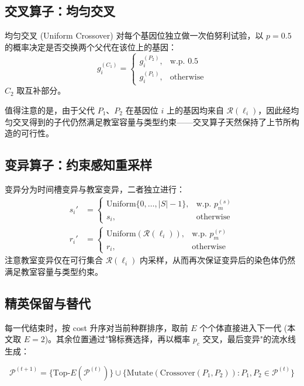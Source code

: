 \subsection{交叉算子：均匀交叉}

均匀交叉 (Uniform Crossover) 对每个基因位独立做一次伯努利试验，以 $p = 0.5$ 的概率决定是否交换两个父代在该位上的基因：
\begin{equation}
  g_i^{(C_1)} = \begin{cases} g_i^{(P_2)}, & \text{w.p. } 0.5 \\ g_i^{(P_1)}, & \text{otherwise} \end{cases}
\end{equation}
$C_2$ 取互补部分。

值得注意的是，由于父代 $P_1$、$P_2$ 在基因位 $i$ 上的基因均来自 $\mathcal{R}(\ell_i)$，因此经均匀交叉得到的子代仍然满足教室容量与类型约束——交叉算子天然保持了上节所构造的可行性。

\subsection{变异算子：约束感知重采样}

变异分为时间槽变异与教室变异，二者独立进行：
\begin{align}
  s_i' &= \begin{cases} \mathrm{Uniform}\{0,\ldots,|S|-1\}, & \text{w.p. } p_m^{(s)} \\ s_i, & \text{otherwise} \end{cases} \\
  r_i' &= \begin{cases} \mathrm{Uniform}(\mathcal{R}(\ell_i)), & \text{w.p. } p_m^{(r)} \\ r_i, & \text{otherwise} \end{cases}
\end{align}
注意教室变异仅在可行集合 $\mathcal{R}(\ell_i)$ 内采样，从而再次保证变异后的染色体仍然满足教室容量与类型约束。

\subsection{精英保留与替代}

每一代结束时，按 cost 升序对当前种群排序，取前 $E$ 个个体直接进入下一代 (本文取 $E = 2$)。其余位置通过"锦标赛选择，再以概率 $p_c$ 交叉，最后变异"的流水线生成：

\begin{equation}
  \mathcal{P}^{(t+1)} = \{\text{Top-}E(\mathcal{P}^{(t)})\} \cup \{\mathrm{Mutate}(\mathrm{Crossover}(P_1, P_2)) : P_1, P_2 \in \mathcal{P}^{(t)}\}
\end{equation}

